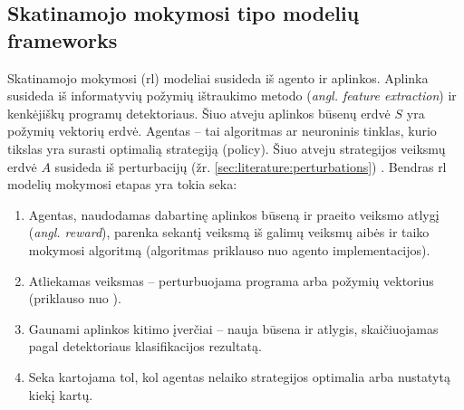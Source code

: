\subsection{Skatinamojo mokymosi tipo modelių \glspl{framework}}\label{sec:literature:rl}

Skatinamojo mokymosi (\acs{rl}) modeliai susideda iš agento ir aplinkos.
Aplinka susideda iš informatyvių požymių ištraukimo metodo (\textit{angl.
    feature extraction}) ir kenkėjiškų programų detektoriaus. Šiuo atveju aplinkos
būsenų erdvė $S$ yra požymių vektorių erdvė. Agentas -- tai algoritmas ar neuroninis
tinklas, kurio tikslas yra surasti optimalią strategiją (\gls{policy}). Šiuo
atveju strategijos veiksmų erdvė $A$ susideda iš perturbacijų (žr.
\ref{sec:literature:perturbations}) \citeplace. Bendras \ac{rl} modelių
mokymosi etapas yra tokia seka:
\begin{enumerate}
    \item Agentas, naudodamas dabartinę aplinkos būseną ir praeito veiksmo atlygį
          (\textit{angl. reward}), parenka sekantį veiksmą iš galimų veiksmų aibės ir taiko mokymosi algoritmą (algoritmas priklauso nuo agento implementacijos).
    \item Atliekamas veiksmas -- perturbuojama programa arba požymių vektorius (priklauso
          nuo ).
    \item Gaunami aplinkos kitimo įverčiai -- nauja būsena ir atlygis, skaičiuojamas
          pagal detektoriaus klasifikacijos rezultatą.
    \item Seka kartojama tol, kol agentas nelaiko strategijos optimalia arba nustatytą
          kiekį kartų.
\end{enumerate}
\citeplace{}

